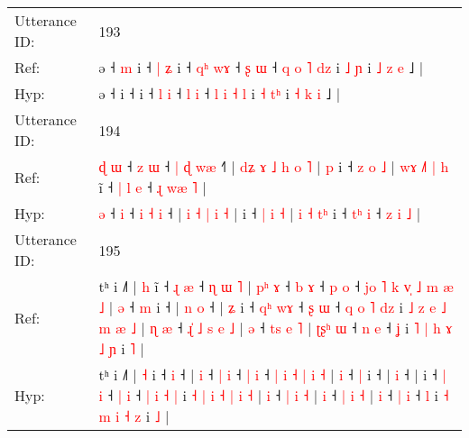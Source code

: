 \documentclass[10pt]{article}
\DeclareRobustCommand{\hl}[1]{{\textcolor{red}{#1}}}
\begin{document}
\begin{longtable}{ll}
 \\
\midrule
Utterance ID: & 193 \\
Ref: & ə ˧\hl{ }\hl{m} i ˧\hl{ }\hl{|}\hl{ }\hl{ʑ} i ˧ \hl{q}\hl{ʰ} \hl{w}\hl{ɤ} ˧ \hl{ʂ} \hl{ɯ} ˧ \hl{q} \hl{o} \hl{˥} \hl{d}\hl{z} i \hl{˩} \hl{}\hl{ɲ} i \hl{˩} \hl{z} \hl{e} ˩ |
 \\
Hyp: & ə ˧\hl{}\hl{} i ˧\hl{}\hl{}\hl{}\hl{} i ˧ \hl{}\hl{l} \hl{}\hl{i} ˧ \hl{l} \hl{i} ˧ \hl{l} \hl{i} \hl{˧} \hl{}\hl{l} i \hl{˧} \hl{t}\hl{ʰ} i \hl{˧} \hl{k} \hl{i} ˩ |
 \\
\midrule
Utterance ID: & 194 \\
Ref: & \hl{ɖ}\hl{ }\hl{ɯ} ˧\hl{ }\hl{z} \hl{ɯ} ˧ \hl{|} \hl{ɖ} \hl{w}\hl{æ} ˧\hl{˥} |\hl{ }\hl{d}\hl{ʑ} \hl{ɤ} \hl{˩} \hl{h} \hl{o} \hl{˥} |\hl{ }\hl{p} i ˧ \hl{z} \hl{o} \hl{˩} | \hl{w}\hl{ɤ} \hl{˩}\hl{˥} \hl{|}\hl{ }\hl{h} i\hl{̃} ˧ \hl{|}\hl{ }\hl{l} \hl{e} ˧ \hl{ɻ} \hl{w}\hl{æ} \hl{˥} |
 \\
Hyp: & \hl{}\hl{}\hl{ə} ˧\hl{}\hl{} \hl{i} ˧ \hl{i} \hl{˧} \hl{}\hl{i} ˧\hl{} |\hl{}\hl{}\hl{} \hl{i} \hl{˧} \hl{|} \hl{i} \hl{˧} |\hl{}\hl{} i ˧ \hl{|} \hl{i} \hl{˧} | \hl{}\hl{i} \hl{}\hl{˧} \hl{}\hl{t}\hl{ʰ} i\hl{} ˧ \hl{}\hl{t}\hl{ʰ} \hl{i} ˧ \hl{z} \hl{}\hl{i} \hl{˩} |
 \\
\midrule
Utterance ID: & 195 \\
Ref: & tʰ i ˩˥ | \hl{h} i\hl{̃} ˧\hl{ }\hl{ɻ} \hl{æ} ˧\hl{ }\hl{ɳ}\hl{ }\hl{ɯ}\hl{ }\hl{˥} |\hl{ }\hl{p}\hl{ʰ} \hl{ɤ} ˧ \hl{b} \hl{ɤ} ˧ \hl{p} \hl{o} ˧\hl{ }\hl{j}\hl{o}\hl{ }\hl{˥} \hl{k} \hl{v}\hl{̩} \hl{˩} \hl{m} \hl{æ} \hl{˩} | \hl{ə} ˧ \hl{m} i ˧ |\hl{ }\hl{n} \hl{o} ˧ |\hl{ }\hl{ʑ} i ˧ \hl{q}\hl{ʰ} \hl{w}\hl{ɤ} ˧ \hl{ʂ} \hl{ɯ} ˧ \hl{q} \hl{o} \hl{˥} \hl{d}\hl{z} i \hl{˩} \hl{z} \hl{e} \hl{˩} \hl{m} \hl{æ} \hl{˩} |\hl{ }\hl{ɳ} \hl{æ} ˧\hl{ }\hl{ɻ}\hl{̍}\hl{ }\hl{˩} \hl{s} \hl{e} \hl{˩} | \hl{ə} ˧ \hl{t}\hl{s} \hl{e} \hl{˥} |\hl{ }\hl{ʈ}\hl{ʂ}\hl{ʰ} \hl{ɯ} ˧ \hl{n} \hl{e} ˧ \hl{ʝ} i\hl{ }\hl{˥} \hl{|} \hl{h} \hl{ɤ} \hl{˩} \hl{ɲ} i \hl{˥} |
 \\
Hyp: & tʰ i ˩˥ | \hl{˧} i\hl{} ˧\hl{}\hl{} \hl{i} ˧\hl{}\hl{}\hl{}\hl{}\hl{}\hl{} |\hl{}\hl{}\hl{} \hl{i} ˧ \hl{|} \hl{i} ˧ \hl{|} \hl{i} ˧\hl{}\hl{}\hl{}\hl{}\hl{} \hl{|} \hl{}\hl{i} \hl{˧} \hl{|} \hl{i} \hl{˧} | \hl{i} ˧ \hl{|} i ˧ |\hl{}\hl{} \hl{i} ˧ |\hl{}\hl{} i ˧ \hl{}\hl{|} \hl{}\hl{i} ˧ \hl{|} \hl{i} ˧ \hl{|} \hl{i} \hl{˧} \hl{}\hl{|} i \hl{˧} \hl{|} \hl{i} \hl{˧} \hl{|} \hl{i} \hl{˧} |\hl{}\hl{} \hl{i} ˧\hl{}\hl{}\hl{}\hl{}\hl{} \hl{|} \hl{i} \hl{˧} | \hl{i} ˧ \hl{}\hl{|} \hl{i} \hl{˧} |\hl{}\hl{}\hl{}\hl{} \hl{i} ˧ \hl{|} \hl{i} ˧ \hl{l} i\hl{}\hl{} \hl{˧} \hl{m} \hl{i} \hl{˧} \hl{z} i \hl{˩} |

\end{longtable}
\end{document}
